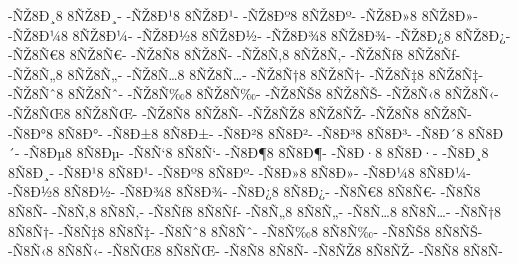 {-ÑŽ8Ð¸8
8ÑŽ8Ð¸-
-ÑŽ8Ð¹8
8ÑŽ8Ð¹-
-ÑŽ8Ðº8
8ÑŽ8Ðº-
-ÑŽ8Ð»8
8ÑŽ8Ð»-
-ÑŽ8Ð¼8
8ÑŽ8Ð¼-
-ÑŽ8Ð½8
8ÑŽ8Ð½-
-ÑŽ8Ð¾8
8ÑŽ8Ð¾-
-ÑŽ8Ð¿8
8ÑŽ8Ð¿-
-ÑŽ8Ñ€8
8ÑŽ8Ñ€-
-ÑŽ8Ñ8
8ÑŽ8Ñ-
-ÑŽ8Ñ‚8
8ÑŽ8Ñ‚-
-ÑŽ8Ñƒ8
8ÑŽ8Ñƒ-
-ÑŽ8Ñ„8
8ÑŽ8Ñ„-
-ÑŽ8Ñ…8
8ÑŽ8Ñ…-
-ÑŽ8Ñ†8
8ÑŽ8Ñ†-
-ÑŽ8Ñ‡8
8ÑŽ8Ñ‡-
-ÑŽ8Ñˆ8
8ÑŽ8Ñˆ-
-ÑŽ8Ñ‰8
8ÑŽ8Ñ‰-
-ÑŽ8ÑŠ8
8ÑŽ8ÑŠ-
-ÑŽ8Ñ‹8
8ÑŽ8Ñ‹-
-ÑŽ8ÑŒ8
8ÑŽ8ÑŒ-
-ÑŽ8Ñ8
8ÑŽ8Ñ-
-ÑŽ8ÑŽ8
8ÑŽ8ÑŽ-
-ÑŽ8Ñ8
8ÑŽ8Ñ-
-Ñ8Ð°8
8Ñ8Ð°-
-Ñ8Ð±8
8Ñ8Ð±-
-Ñ8Ð²8
8Ñ8Ð²-
-Ñ8Ð³8
8Ñ8Ð³-
-Ñ8Ð´8
8Ñ8Ð´-
-Ñ8Ðµ8
8Ñ8Ðµ-
-Ñ8Ñ‘8
8Ñ8Ñ‘-
-Ñ8Ð¶8
8Ñ8Ð¶-
-Ñ8Ð·8
8Ñ8Ð·-
-Ñ8Ð¸8
8Ñ8Ð¸-
-Ñ8Ð¹8
8Ñ8Ð¹-
-Ñ8Ðº8
8Ñ8Ðº-
-Ñ8Ð»8
8Ñ8Ð»-
-Ñ8Ð¼8
8Ñ8Ð¼-
-Ñ8Ð½8
8Ñ8Ð½-
-Ñ8Ð¾8
8Ñ8Ð¾-
-Ñ8Ð¿8
8Ñ8Ð¿-
-Ñ8Ñ€8
8Ñ8Ñ€-
-Ñ8Ñ8
8Ñ8Ñ-
-Ñ8Ñ‚8
8Ñ8Ñ‚-
-Ñ8Ñƒ8
8Ñ8Ñƒ-
-Ñ8Ñ„8
8Ñ8Ñ„-
-Ñ8Ñ…8
8Ñ8Ñ…-
-Ñ8Ñ†8
8Ñ8Ñ†-
-Ñ8Ñ‡8
8Ñ8Ñ‡-
-Ñ8Ñˆ8
8Ñ8Ñˆ-
-Ñ8Ñ‰8
8Ñ8Ñ‰-
-Ñ8ÑŠ8
8Ñ8ÑŠ-
-Ñ8Ñ‹8
8Ñ8Ñ‹-
-Ñ8ÑŒ8
8Ñ8ÑŒ-
-Ñ8Ñ8
8Ñ8Ñ-
-Ñ8ÑŽ8
8Ñ8ÑŽ-
-Ñ8Ñ8
8Ñ8Ñ-
}
